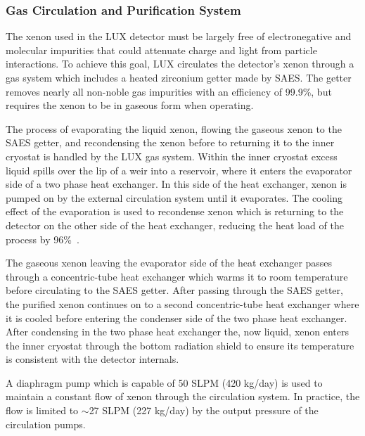 \subsubsection{Gas Circulation and Purification System} \label{GasSystem}
The xenon used in the LUX detector must be largely free of electronegative and molecular impurities that could attenuate charge and light from particle interactions.  To achieve this goal, LUX circulates the detector’s xenon through a gas system which includes a heated zirconium getter made by SAES.  The getter removes nearly all non-noble gas impurities with an efficiency of 99.9\%, but requires the xenon to be in gaseous form when operating.  

The process of evaporating the liquid xenon, flowing the gaseous xenon to the SAES getter, and recondensing the xenon before to returning it to the inner cryostat is handled by the LUX gas system. Within the inner cryostat excess liquid spills over the lip of a weir into a reservoir, where it enters the evaporator side of a two phase heat exchanger.  In this side of the heat exchanger, xenon is pumped on by the external circulation system until it evaporates. The cooling effect of the evaporation is used to recondense xenon which is returning to the detector on the other side of the heat exchanger, reducing the heat load of the process by 96\%~\cite{BradleyThesis}.


The gaseous xenon leaving the evaporator side of the heat exchanger passes through a concentric-tube heat exchanger which warms it to room temperature before circulating to the SAES getter.  After passing through the SAES getter, the purified xenon continues on to a second concentric-tube heat exchanger where it is cooled before entering the condenser side of the two phase heat exchanger.  After condensing in the two phase heat exchanger the, now liquid, xenon enters the inner cryostat through the bottom radiation shield to ensure its temperature is consistent with the detector internals.

A diaphragm pump which is capable of 50 SLPM (420 kg/day) is used to maintain a constant flow of xenon through the circulation system.  In practice, the flow is limited to $\sim$27 SLPM (227 kg/day) by the output pressure of the circulation pumps. 

